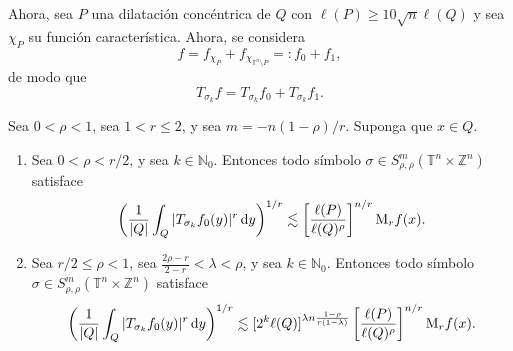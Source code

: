 Ahora, sea $P$ una dilatación concéntrica de $Q$ con $\ell(P)\geq 10\sqrt{n}\ell(Q)$ y sea $\chi_P$ su función característica. Ahora, se considera 
\begin{equation}
	f = f_{\chi_P} + f_{\chi_{\mathbb{T}^n\setminus P}} =: f_0 + f_1,
	\label{eq:decomposition}
\end{equation}
de modo que
\begin{equation*}
	T_{\sigma_k}f = T_{\sigma_k}f_0 + T_{\sigma_k}f_1.
\end{equation*}
\begin{proposition}
	Sea $0<\rho<1$, sea $1<r\leq2$, y sea $m=-n(1-\rho)/r$. Suponga que $x\in Q$.
	
	\begin{enumerate}
		\item Sea $0<\rho<r/2$, y sea $k\in\mathbb{N}_0$. Entonces todo símbolo $\sigma \in S^m_{\rho,\rho}(\mathbb{T}^n \times \mathbb{Z}^n) $ satisface
		\begin{equation}
			\left( \frac{1}{|Q|}\int_Q |T_{\sigma_k} f_0(y)|^r\mathop{}\!\mathrm{d} y  
			\right)^{1/r} \lesssim \left[ \frac{\ell(P)}{\ell(Q)^\rho} 
			\right]^{n/r} \mathrm{M}_rf(x).
			\label{eq:fo-estimate-rho-less}
		\end{equation}
		\item Sea $r/2\leq \rho <1$, sea $ \frac{2\rho - r}{2-r} < \lambda < \rho$, y sea $k\in\mathbb{N}_0$. Entonces todo símbolo $\sigma \in S^m_{\rho,\rho}(\mathbb{T}^n \times \mathbb{Z}^n) $ satisface
		\begin{equation}
			\left( \frac{1}{|Q|}\int_Q|T_{\sigma_k}f_0(y)|^r \mathop{}\!\mathrm{d} y
			\right)^{1/r} \lesssim [2^k\ell(Q)]^{\lambda n \frac{1-\rho}{r(1-\lambda)}} \left[ \frac{\ell(P)}{\ell(Q)^\rho}
			\right]^{n/r} \mathrm{M}_rf(x).
			\label{eq:f0-estimate-rho-greater}
		\end{equation}
	\end{enumerate}
\end{proposition}
